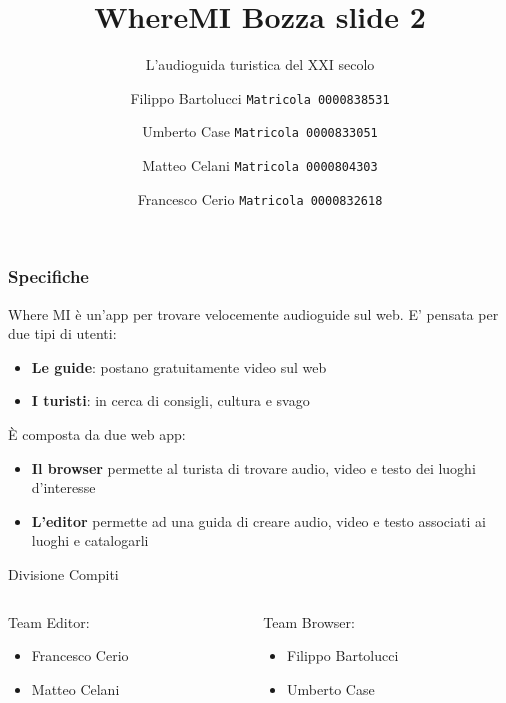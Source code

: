 \documentclass{beamer}
\title{WhereMI Bozza slide 2}
\subtitle{L'audioguida turistica del XXI secolo}
\author{
  Filippo Bartolucci
  \texttt{Matricola 0000838531}\\
  \and
  Umberto Case
  \texttt{Matricola 0000833051}\\
    \and
  Matteo Celani
  \texttt{Matricola 0000804303}\\
    \and
  Francesco Cerio
  \texttt{Matricola 0000832618}
 }
\institute{Università di Bologna}
\date{}
\begin{document}
\begin{frame}
\titlepage
\end{frame}

\begin{frame}
\frametitle{Specifiche}
Where MI è un'app per trovare velocemente audioguide sul web. E' pensata per due tipi di utenti:
\begin{itemize}
  \item \textbf{Le guide}: postano gratuitamente video sul web
  \item \textbf{I turisti}: in cerca di consigli, cultura e svago
\end{itemize}
\vspace{0.2cm}
È composta da due web app:
\begin{itemize}
  \item \textbf{Il browser} permette al turista di trovare audio, video e testo dei luoghi d'interesse
  \item \textbf{L'editor} permette ad una guida di creare audio, video e testo associati ai luoghi e catalogarli
\end{itemize}
\vspace{0.2cm}
\centering Divisione Compiti
\vspace{0.2cm}
  \begin{columns}
    \begin{column}{.48\textwidth} %
    Team Editor:
 \begin{itemize}
  \item Francesco Cerio
  \item Matteo Celani
\end{itemize}
    \end{column}
    \hfill
    \begin{column}{.48 \textwidth}
    Team Browser:
  \begin{itemize}
  \item Filippo Bartolucci
  \item Umberto Case
\end{itemize}
    \end{column}
  \end{columns}
\end{frame}
\end{document}
